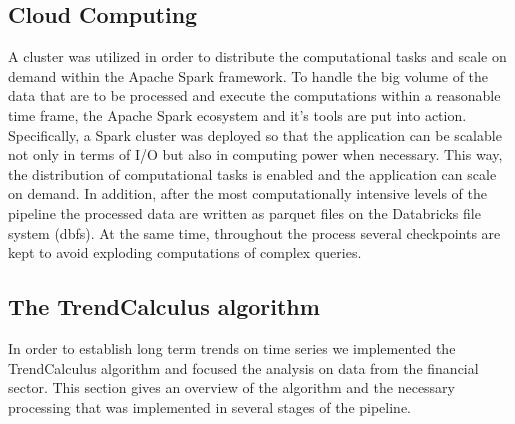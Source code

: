 \documentclass[a4, 11pt]{article}
\begin{document}
\subsection{Cloud Computing}
A cluster was utilized in order to distribute the computational tasks and scale on demand within the Apache Spark framework. To handle the big volume of the data that are to be processed and execute the computations within a reasonable time frame, the Apache Spark ecosystem and it's tools are put into action. Specifically, a Spark cluster was deployed so that the application can be scalable not only in terms of I/O but also in computing power when necessary. This way, the distribution of computational tasks is enabled and the application can scale on demand.  In addition, after the most computationally intensive levels of the pipeline the processed data are written as parquet files on the Databricks file system (dbfs). At the same time, throughout the process several checkpoints are kept to avoid exploding computations of complex queries.


\subsection{The TrendCalculus algorithm}
In order to establish long term trends on time series we implemented the TrendCalculus algorithm and focused the analysis on data from the financial sector. This section gives an overview of the algorithm and the necessary processing that was implemented in several stages of the pipeline. 
\end{document}
